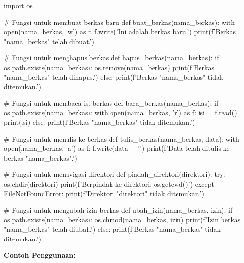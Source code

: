 \documentclass[12pt]{article}
\begin{document}
\begin{python}
import os

# Fungsi untuk membuat berkas baru
def buat_berkas(nama_berkas):
    with open(nama_berkas, 'w') as f:
        f.write('Ini adalah berkas baru.\n')
    print(f'Berkas "{nama_berkas}" telah dibuat.')

# Fungsi untuk menghapus berkas
def hapus_berkas(nama_berkas):
    if os.path.exists(nama_berkas):
        os.remove(nama_berkas)
        print(f'Berkas "{nama_berkas}" telah dihapus.')
    else:
        print(f'Berkas "{nama_berkas}" tidak ditemukan.')

# Fungsi untuk membaca isi berkas
def baca_berkas(nama_berkas):
    if os.path.exists(nama_berkas):
        with open(nama_berkas, 'r') as f:
            isi = f.read()
            print(isi)
    else:
        print(f'Berkas "{nama_berkas}" tidak ditemukan.')

# Fungsi untuk menulis ke berkas
def tulis_berkas(nama_berkas, data):
    with open(nama_berkas, 'a') as f:
        f.write(data + '\n')
    print(f'Data telah ditulis ke berkas "{nama_berkas}".')

# Fungsi untuk menavigasi direktori
def pindah_direktori(direktori):
    try:
        os.chdir(direktori)
        print(f'Berpindah ke direktori: {os.getcwd()}')
    except FileNotFoundError:
        print(f'Direktori "{direktori}" tidak ditemukan.')

# Fungsi untuk mengubah izin berkas
def ubah_izin(nama_berkas, izin):
    if os.path.exists(nama_berkas):
        os.chmod(nama_berkas, izin)
        print(f'Izin berkas "{nama_berkas}" telah diubah.')
    else:
        print(f'Berkas "{nama_berkas}" tidak ditemukan.')
\end{python}
\textbf{Contoh Penggunaan:}
\end{document}
